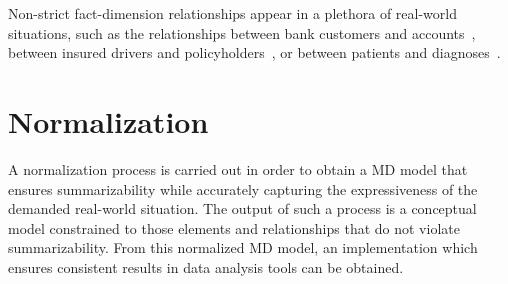 \begin{table}
\centering \caption{Double counting problem for sales aggregated by
salesperson}
     \label{a3:tab:DimensioningNonStrictness}
 \qquad \qquad {}
\end{table}



Non-strict fact-dimension relationships appear in a pletho\-ra of
real-world situations, such as the relationships between bank
customers and accounts~\cite{book/Kimball/DW}, between insured
drivers and policyholders~\cite{book/Kimball/DW}, or between
patients and
diagnoses~\cite{book/Kimball/DW,DBLP:journals/is/PedersenJD01,DBLP:conf/dmdw/SongRME01}.


\section{Normalization}\label{a3:sec:fact_dim2}
A normalization process is carried out in order to obtain a MD model
that ensures summarizability while accurately capturing the
expressiveness of the demanded real-world situation. The output of
such a process is a conceptual model constrained to those elements
and relationships that do not violate summarizability. From this
normalized MD model, an implementation which ensures consistent
results in data analysis tools can be obtained.

